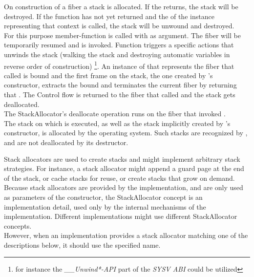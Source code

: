 \label{destruction}

On construction of a fiber a stack is allocated. If the \entryfn\xspace returns,
the stack will be destroyed. If the function has not yet returned and the
 of the \fiber instance representing that context is called,
the stack will be unwound and destroyed.\\

For this purpose member-function \resumewith is called with \unwindfib as
argument. The fiber will be temporarily resumed and \unwindfib is
invoked. Function \unwindfib triggers a specific actions that unwinds the stack
(walking the stack and destroying automatic variables in reverse order of
construction)
\footnote{for instance the \emph{\_\_Unwind*-API} part of the
\emph{SYSV ABI} could be utilized}.
An instance of \fiber that represents the fiber that called \resumewith is bound
and the first frame on the stack, the one created by \fiber's constructor,
extracts the bound \fiber and terminates the current fiber by returning that
\fiber. The Control flow is returned to the fiber that called \dtor and the
stack gets deallocated.\\

The StackAllocator's deallocate operation runs on the fiber that invoked
\dtor.\\

The stack on which  is executed, as well as the stack implicitly
created by 's constructor, is allocated by the operating
system. Such stacks are recognized by \fiber, and are not deallocated by its
destructor.


\label{stackalloc}

Stack allocators are used to create stacks and might implement arbitrary stack
strategies. For instance, a stack allocator might append a guard page at the end
of the stack, or cache stacks for reuse, or create stacks that grow on demand.\\

Because stack allocators are provided by the implementation, and are only used
as parameters of the constructor, the StackAllocator concept is an
implementation detail, used only by the internal mechanisms of the
implementation. Different implementations might use different StackAllocator
concepts.\\

However, when an implementation provides a stack allocator matching one of
the descriptions below, it should use the specified name.\\

